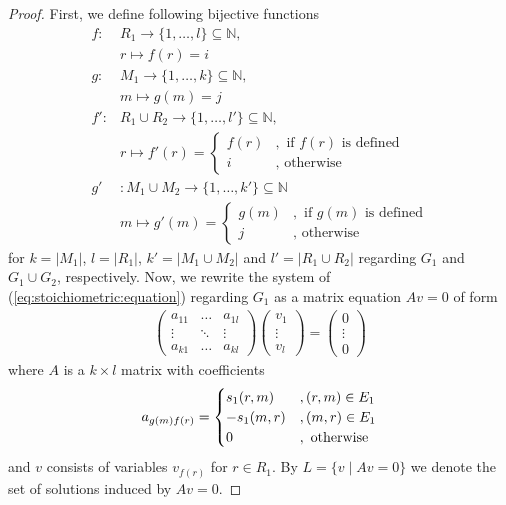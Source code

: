 \begin{proof}
First, we define following bijective functions
\begin{align*}
f:&R_1 \rightarrow \{1,\dots,l\}\subseteq\mathbb{N}, \\
& r \mapsto f(r)=i \\
g:&M_1 \rightarrow \{1,\dots,k\}\subseteq\mathbb{N}, \\
& m \mapsto g(m)=j \\
f':&R_1\cup R_2 \rightarrow \{1,\dots,l'\}\subseteq\mathbb{N}, \\
& r \mapsto f'(r)=
    \begin{cases}
    f(r) &, \text{ if $f(r)$ is defined} \\
    i    &, \text{ otherwise}
    \end{cases} \\
g'&:M_1\cup M_2 \rightarrow \{1,\dots,k'\}\subseteq\mathbb{N} \\
& m \mapsto g'(m)=
    \begin{cases}
    g(m) &, \text{ if $g(m)$ is defined} \\
    j    &, \text{ otherwise}
    \end{cases}
\end{align*}
for $k=|M_1|$, $l=|R_1|$, $k'=|M_1\cup M_2|$ and $l'=|R_1\cup R_2|$ regarding $G_1$ and $G_1\cup G_2$, respectively.
Now, we rewrite the system of (\ref{eq:stoichiometric:equation}) regarding $G_1$ as a matrix equation $Av=0$ of form
\begin{align*}
\begin{pmatrix}
a_{11} & \dots & a_{1l} \\
\vdots & \ddots & \vdots \\
a_{k1} & \dots & a_{kl}
\end{pmatrix}
\begin{pmatrix}
v_1 \\
\vdots  \\
v_l
\end{pmatrix}
=
\begin{pmatrix}
0 \\
\vdots \\
0
\end{pmatrix}\label{eq:matrix}
\end{align*}
where $A$ is a $k\times l$ matrix with coefficients
\begin{align*}
a_{g(m)f(r)}=
    \begin{cases}
    s_1(r,m)  &, (r,m)\in E_1 \\
    -s_1(m,r) &, (m,r)\in E_1 \\
    0       &, \text{ otherwise}
    \end{cases}
\end{align*}
and $v$ consists of variables $v_{f(r)}$ for $r\in R_1$.
By $L=\{v\mid Av=0\}$ we denote the set of solutions induced by $Av=0$.


\end{proof}
